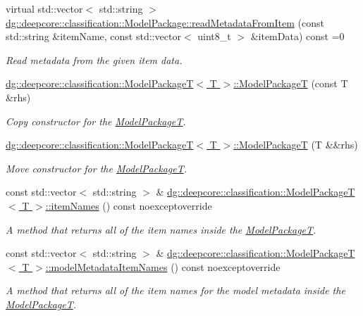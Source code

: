\begin{DoxyCompactItemize}
virtual std\+::vector$<$ std\+::string $>$ \hyperlink{group___classification_module_ga479f0578c384bfe7d21f32d4bfb33983}{dg\+::deepcore\+::classification\+::\+Model\+Package\+::read\+Metadata\+From\+Item} (const std\+::string \&item\+Name, const std\+::vector$<$ uint8\+\_\+t $>$ \&item\+Data) const =0
\begin{DoxyCompactList}\small\item\em Read metadata from the given item data. \end{DoxyCompactList}\item 
\hyperlink{group___classification_module_ga7ea483bc134d550711472d177240637f}{dg\+::deepcore\+::classification\+::\+Model\+Package\+T$<$ T $>$\+::\+Model\+PackageT} (const T \&rhs)
\begin{DoxyCompactList}\small\item\em Copy constructor for the \hyperlink{classdg_1_1deepcore_1_1classification_1_1_model_package_t}{Model\+PackageT}. \end{DoxyCompactList}\item 
\hyperlink{group___classification_module_gae62b39fccdfbce7d738a502ea34a6b4d}{dg\+::deepcore\+::classification\+::\+Model\+Package\+T$<$ T $>$\+::\+Model\+PackageT} (T \&\&rhs)
\begin{DoxyCompactList}\small\item\em Move constructor for the \hyperlink{classdg_1_1deepcore_1_1classification_1_1_model_package_t}{Model\+PackageT}. \end{DoxyCompactList}\item 
const std\+::vector$<$ std\+::string $>$ \& \hyperlink{group___classification_module_ga70d0c57bcb0d88c44be41e2591e42518}{dg\+::deepcore\+::classification\+::\+Model\+Package\+T$<$ T $>$\+::item\+Names} () const noexceptoverride
\begin{DoxyCompactList}\small\item\em A method that returns all of the item names inside the \hyperlink{classdg_1_1deepcore_1_1classification_1_1_model_package_t}{Model\+PackageT}. \end{DoxyCompactList}\item 
const std\+::vector$<$ std\+::string $>$ \& \hyperlink{group___classification_module_ga6a84bb23e9720db751a63cc071ec15ab}{dg\+::deepcore\+::classification\+::\+Model\+Package\+T$<$ T $>$\+::model\+Metadata\+Item\+Names} () const noexceptoverride
\begin{DoxyCompactList}\small\item\em A method that returns all of the item names for the model metadata inside the \hyperlink{classdg_1_1deepcore_1_1classification_1_1_model_package_t}{Model\+PackageT}. \end{DoxyCompactList}\item 

\end{DoxyCompactItemize}
